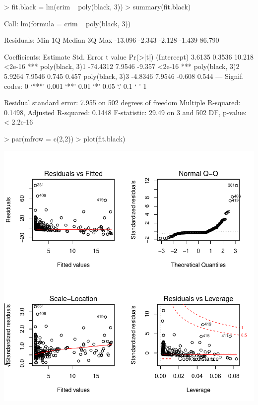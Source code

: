 \documentclass[a4paper]{article}
\begin{document}
\begin{Schunk}
\begin{Sinput}
> fit.black = lm(crim ~ poly(black, 3))
> summary(fit.black)
\end{Sinput}
\begin{Soutput}
Call:
lm(formula = crim ~ poly(black, 3))

Residuals:
    Min      1Q  Median      3Q     Max 
-13.096  -2.343  -2.128  -1.439  86.790 

Coefficients:
                Estimate Std. Error t value Pr(>|t|)    
(Intercept)       3.6135     0.3536  10.218   <2e-16 ***
poly(black, 3)1 -74.4312     7.9546  -9.357   <2e-16 ***
poly(black, 3)2   5.9264     7.9546   0.745    0.457    
poly(black, 3)3  -4.8346     7.9546  -0.608    0.544    
---
Signif. codes:  0 ‘***’ 0.001 ‘**’ 0.01 ‘*’ 0.05 ‘.’ 0.1 ‘ ’ 1

Residual standard error: 7.955 on 502 degrees of freedom
Multiple R-squared:  0.1498,	Adjusted R-squared:  0.1448 
F-statistic: 29.49 on 3 and 502 DF,  p-value: < 2.2e-16
\end{Soutput}
\begin{Sinput}
> par(mfrow = c(2,2))
> plot(fit.black)
\end{Sinput}
\end{Schunk}
\includegraphics{mutivariblelm-black2}
\end{document}
